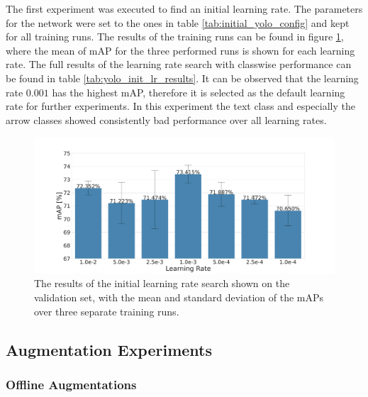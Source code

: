 
The first experiment was executed to find an initial learning rate.
The parameters for the network were set to the ones in table \ref{tab:initial_yolo_config} and kept for all training runs.
The results of the training runs can be found in figure \ref{fig:yolo_lr_experiment_results}, where the mean of mAP for the three performed runs is shown for each learning rate.
The full results of the learning rate search with classwise performance can be found in table \ref{tab:yolo_init_lr_results}.
It can be observed that the learning rate $0.001$ has the highest \ac{mAP}, therefore it is selected as the default learning rate for further experiments.
In this experiment the text class and especially the arrow classes showed consistently bad performance over all learning rates.

\begin{figure}
\begin{center}
    \includegraphics[width=13cm]{imgs/yolo_lr_experiment.pdf}
    \caption{The results of the initial learning rate search shown on the validation set, with the mean and standard deviation of the \acp{mAP} over three separate training runs.}
    \label{fig:yolo_lr_experiment_results}
\end{center}
\end{figure}

\subsection{Augmentation Experiments}
\label{sec:yolo_augs}

\subsubsection{Offline Augmentations}

